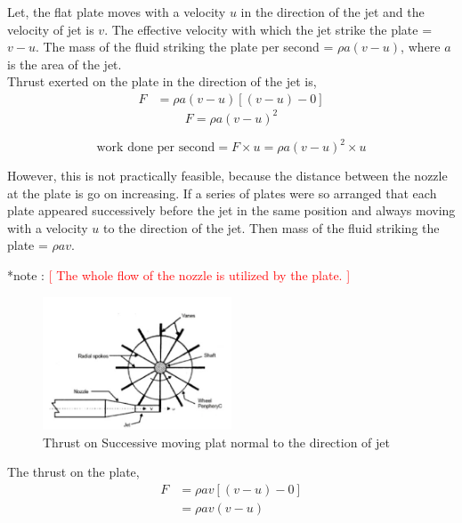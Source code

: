 \documentclass{article}
\begin{document}
Let, the flat plate moves with a velocity $u$ in the direction of the jet and the velocity of jet is $v$. The effective velocity with which the jet strike the plate = $v-u$. The mass of the fluid striking the plate per second = $\rho a (v-u)$, where $a$ is the area of the jet. \\
Thrust exerted on the plate in the direction of the jet is, 
\begin{align*}
  F &= \rho a (v-u) [(v-u) - 0]
\end{align*}
\begin{equation}
    F = \rho a (v-u)^2 \label{eq:eq15}
\end{equation}

\begin{equation}
    \text{work done per second} = F \times u = \rho a (v-u)^{2} \times u \label{eq:eq16}
\end{equation}

However, this is not practically feasible, because the distance between the nozzle at the plate is go on increasing. If a series of plates were so arranged that each plate appeared successively before the jet in the same position and always moving with a velocity $u$ to the direction of the jet. Then mass of the fluid striking the plate = $\rho a v$.

*note : \textcolor{red}{ [ The whole flow of the nozzle is utilized by the plate. ]}

\begin{figure}[H]
  \centering
  \includegraphics[width=0.5\textwidth]{img/radial_plate.jpg} 
  \caption{Thrust on Successive moving plat normal to the direction of jet}
  \label{fig:Successive_moving_plate}
\end{figure} 


The thrust on the plate,
\begin{align*}
  F &= \rho a v [(v-u) - 0] \\
  &= \rho a v (v-u)\\
\end{align*}
\end{document}

